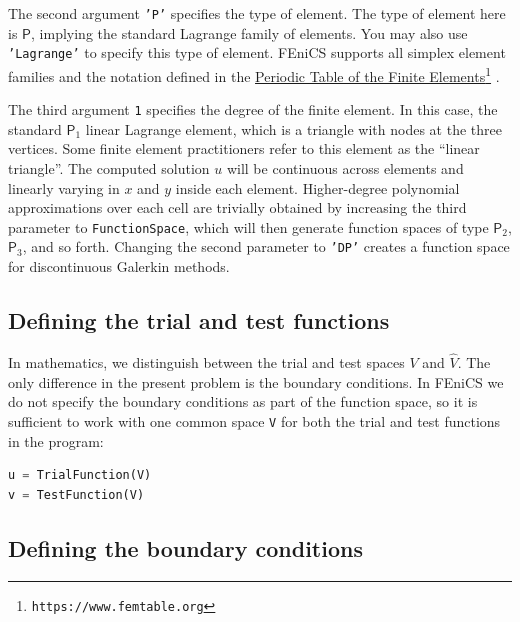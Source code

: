\documentclass[graybox,envcountchap,sectrefs,final]{svmonodo}
\begin{document}
The second argument \texttt{'P'} specifies the type of element. The type of
element here is $\mathsf{P}$, implying the standard Lagrange family of
elements. You may also use \texttt{'Lagrange'} to specify this type of
element. FEniCS supports all simplex element families and the notation
defined in the \href{{https://www.femtable.org}}{Periodic Table of the Finite Elements}\footnote{\texttt{https://www.femtable.org}} \cite{ArnoldLogg2014}.


The third argument \texttt{1} specifies the degree of the finite element.  In
this case, the standard $\mathsf{P}_1$ linear Lagrange element, which
is a triangle with nodes at the three vertices. Some finite element
practitioners refer to this element as the ``linear triangle''. The
computed solution $u$ will be continuous across elements and linearly
varying in $x$ and $y$ inside each element. Higher-degree polynomial
approximations over each cell are trivially obtained by increasing the
third parameter to \texttt{FunctionSpace}, which will then generate function
spaces of type $\mathsf{P}_2$, $\mathsf{P}_3$, and so forth.  Changing
the second parameter to \texttt{'DP'} creates a function space for
discontinuous Galerkin methods.

 

\subsection{Defining the trial and test functions}

In mathematics, we distinguish between the trial and test spaces $V$
and $\hat{V}$. The only difference in the present problem is the
boundary conditions. In FEniCS we do not specify the boundary
conditions as part of the function space, so it is sufficient to work
with one common space \texttt{V} for both the trial and test functions in the
program:

\begin{lstlisting}[language=Python,style=graycolor]
u = TrialFunction(V)
v = TestFunction(V)
\end{lstlisting}


\subsection{Defining the boundary conditions}
\end{document}
